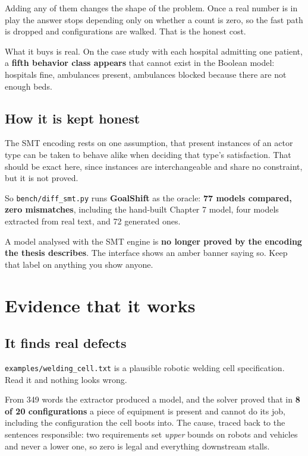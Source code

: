 \documentclass[11pt,a4paper]{article}
\newcommand{\gs}{\textbf{GoalShift}}
\begin{document}
Adding any of them changes the shape of the problem. Once a real number is in play the
answer stops depending only on whether a count is zero, so the fast path is dropped and
configurations are walked. That is the honest cost.

What it buys is real. On the case study with each hospital admitting one patient, a
\textbf{fifth behavior class appears} that cannot exist in the Boolean model: hospitals
fine, ambulances present, ambulances blocked because there are not enough beds.

\subsection{How it is kept honest}

The SMT encoding rests on one assumption, that present instances of an actor type can be
taken to behave alike when deciding that type's satisfaction. That should be exact here,
since instances are interchangeable and share no constraint, but it is not proved.

So \texttt{bench/diff\_smt.py} runs \gs{} as the oracle: \textbf{77 models compared, zero
mismatches}, including the hand-built Chapter 7 model, four models extracted from real
text, and 72 generated ones.

\begin{warnbox}
A model analysed with the SMT engine is \textbf{no longer proved by the encoding the
thesis describes}. The interface shows an amber banner saying so. Keep that label on
anything you show anyone.
\end{warnbox}

\section{Evidence that it works}

\subsection{It finds real defects}

\texttt{examples/welding\_cell.txt} is a plausible robotic welding cell specification.
Read it and nothing looks wrong.

From 349 words the extractor produced a model, and the solver proved that in
\textbf{8 of 20 configurations} a piece of equipment is present and cannot do its job,
including the configuration the cell boots into. The cause, traced back to the
sentences responsible: two requirements set \emph{upper} bounds on robots and vehicles
and never a lower one, so zero is legal and everything downstream stalls.
\end{document}
